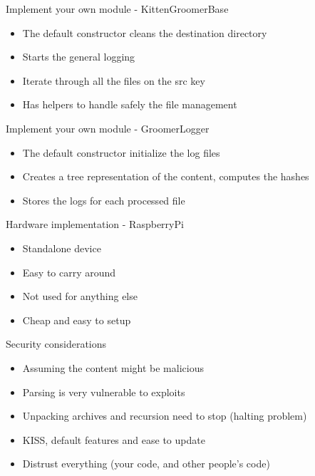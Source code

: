\begin{frame}[fragile]{Implement your own module - KittenGroomerBase}
    \begin{itemize}
        \item The default constructor cleans the destination directory
        \item Starts the general logging
        \item Iterate through all the files on the src key
        \item Has helpers to handle safely the file management
   \end{itemize}
\end{frame}

\begin{frame}[fragile]{Implement your own module - GroomerLogger}
    \begin{itemize}
        \item The default constructor initialize the log files
        \item Creates a tree representation of the content, computes the hashes
        \item Stores the logs for each processed file
   \end{itemize}
\end{frame}

\begin{frame}[fragile]{Hardware implementation - RaspberryPi}
    \begin{itemize}
        \item Standalone device
        \item Easy to carry around
        \item Not used for anything else
        \item Cheap and easy to setup
   \end{itemize}
\end{frame}

\begin{frame}[fragile]{Security considerations}
    \begin{itemize}
        \item Assuming the content might be malicious
        \item Parsing is very vulnerable to exploits
        \item Unpacking archives and recursion need to stop (halting problem)
        \item KISS, default features and ease to update
        \item Distrust everything (your code, and other people's code)
   \end{itemize}
\end{frame}

